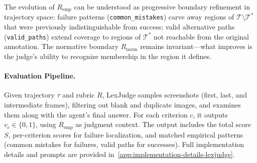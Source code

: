 The evolution of $R_{\text{emp}}$ can be understood as progressive boundary refinement in trajectory space: failure patterns (\texttt{common\_mistakes}) carve away regions of $\mathcal{T} \setminus \mathcal{T}^*$ that were previously indistinguishable from success; valid alternative paths (\texttt{valid\_paths}) extend coverage to regions of $\mathcal{T}^*$ not reachable from the original annotation. The normative boundary $R_{\text{norm}}$ remains invariant---what improves is the judge's ability to recognize membership in the region it defines.

\paragraph{Evaluation Pipeline.}
Given trajectory $\tau$ and rubric $R$, LexJudge samples screenshots (first, last, and intermediate frames), filtering out blank and duplicate images, and examines them along with the agent's final answer. For each criterion $c$, it outputs $v_c \in \{0,1\}$, using $R_{\text{emp}}$ as judgment context. The output includes the total score $S$, per-criterion scores for failure localization, and matched empirical patterns (common mistakes for failures, valid paths for successes). Full implementation details and prompts are provided in~\cref{app:implementation-details-lexjudge}.
